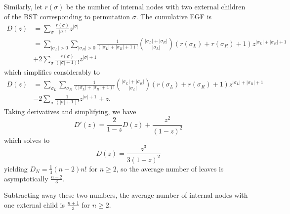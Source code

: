 \documentclass{article}
\begin{document}
Similarly, let $r(\sigma)$ be the number of internal nodes with two external
children of the BST corresponding to permutation $\sigma$. The cumulative EGF
is \begin{align*}
  D(z) &= \sum_{\sigma} \frac{r(\sigma)}{|\sigma|!}z^{|\sigma|} \\
       &= \sum_{|\sigma_L| > 0} \sum_{|\sigma_R| > 0}
       \frac{1}{(|\sigma_L| + |\sigma_R| + 1)!}
       \binom{|\sigma_L| + |\sigma_R|}{|\sigma_L|}(r(\sigma_L) + r(\sigma_R) +
       1)z^{|\sigma_L| + |\sigma_R| + 1} \\
       &+ 2\sum_{\sigma} \frac{r(\sigma)}{(|\sigma| + 1)!}z^{|\sigma| + 1}
\end{align*} which simplifies considerably to \begin{align*}
  D(z) &= \sum_{\sigma_L} \sum_{\sigma_R}
       \frac{1}{(|\sigma_L| + |\sigma_R| + 1)!}
       \binom{|\sigma_L| + |\sigma_R|}{|\sigma_L|}(r(\sigma_L) + r(\sigma_R) +
       1)z^{|\sigma_L| + |\sigma_R| + 1} \\
       &-2\sum_{\sigma} \frac{1}{(|\sigma| + 1)!}z^{|\sigma| + 1} + z.
\end{align*} Taking derivatives and simplifying, we have \begin{equation*}
  D'(z) = \frac{2}{1 - z}D(z) + \frac{z^2}{(1 - z)^2}
\end{equation*} which solves to \begin{equation*}
  D(z) = \frac{z^3}{3(1 - z)^2}
\end{equation*} yielding $D_N = \frac{1}{3}(n - 2)n!$ for $n \geq 2$, so the
average number of leaves is asymptotically $\frac{n - 2}{3}$.

Subtracting away these two numbers, the average number of internal nodes with
one external child is $\frac{n + 1}{3}$ for $n \geq 2$.
\end{document}
